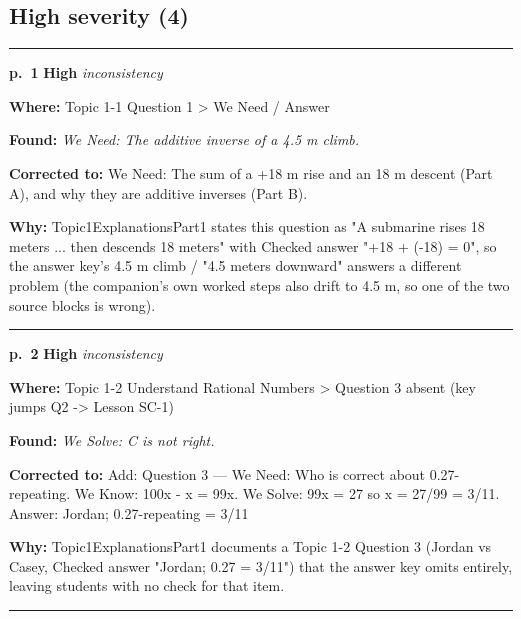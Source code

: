 \documentclass[11pt]{article}
\newcommand{\sevhigh}[1]{\textcolor{red!75!black}{\textbf{#1}}}
\begin{document}
\subsection*{High severity (4)}
\noindent\rule{\textwidth}{0.4pt}\par\nobreak\vspace{2pt}
\noindent\textbf{p.~1} \quad \sevhigh{High} \quad \textit{inconsistency}\par
\noindent\textbf{Where: }Topic 1-1 Question 1 > We Need / Answer\par
\noindent\textbf{Found: }\textit{We Need: The additive inverse of a 4.5 m climb.}\par
\noindent\textbf{Corrected to: }We Need: The sum of a +18 m rise and an 18 m descent (Part A), and why they are additive inverses (Part B).\par
\noindent\textbf{Why: }Topic1ExplanationsPart1 states this question as "A submarine rises 18 meters ... then descends 18 meters" with Checked answer "+18 + (-18) = 0", so the answer key's 4.5 m climb / "4.5 meters downward" answers a different problem (the companion's own worked steps also drift to 4.5 m, so one of the two source blocks is wrong).\par\vspace{4pt}
\noindent\rule{\textwidth}{0.4pt}\par\nobreak\vspace{2pt}
\noindent\textbf{p.~2} \quad \sevhigh{High} \quad \textit{inconsistency}\par
\noindent\textbf{Where: }Topic 1-2 Understand Rational Numbers > Question 3 absent (key jumps Q2 -> Lesson SC-1)\par
\noindent\textbf{Found: }\textit{We Solve: C is not right.}\par
\noindent\textbf{Corrected to: }Add: Question 3 --- We Need: Who is correct about 0.27-repeating. We Know: 100x - x = 99x. We Solve: 99x = 27 so x = 27/99 = 3/11. Answer: Jordan; 0.27-repeating = 3/11\par
\noindent\textbf{Why: }Topic1ExplanationsPart1 documents a Topic 1-2 Question 3 (Jordan vs Casey, Checked answer "Jordan; 0.27 = 3/11") that the answer key omits entirely, leaving students with no check for that item.\par\vspace{4pt}
\noindent\rule{\textwidth}{0.4pt}\par\nobreak\vspace{2pt}
\end{document}
